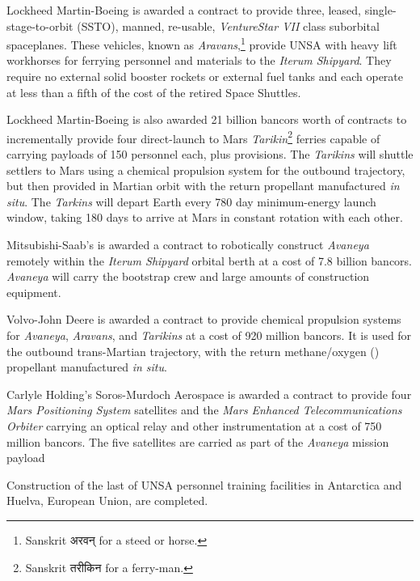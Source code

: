 Lockheed Martin-Boeing is awarded a contract to provide three, leased, single-stage-to-orbit (SSTO), manned, re-usable, {\it VentureStar VII} class suborbital spaceplanes. These vehicles, known as {\it Aravans},\footnote{Sanskrit अरवन् for a steed or horse.} provide UNSA with heavy lift workhorses for ferrying personnel and materials to the {\it Iterum Shipyard}. They require no external solid booster rockets or external fuel tanks and each operate at less than a fifth of the cost of the retired Space Shuttles.

Lockheed Martin-Boeing is also awarded 21 billion bancors worth of contracts to incrementally provide four direct-launch to Mars {\it Tarikin}\footnote{Sanskrit तरीकिन for a ferry-man.} ferries capable of carrying payloads of 150 personnel each, plus provisions. The {\it Tarikins} will shuttle settlers to Mars using a chemical  propulsion system for the outbound trajectory, but then provided in Martian orbit with the return  propellant manufactured {\it in situ}. The {\it Tarkins} will depart Earth every 780 day minimum-energy launch window, taking 180 days to arrive at Mars in constant rotation with each other.

Mitsubishi-Saab's is awarded a contract to robotically construct {\it Avaneya} remotely within the {\it Iterum Shipyard} orbital berth at a cost of 7.8 billion bancors. {\it Avaneya} will carry the bootstrap crew and large amounts of construction equipment.

Volvo-John Deere is awarded a contract to provide chemical propulsion systems for {\it Avaneya}, {\it Aravans}, and {\it Tarikins} at a cost of 920 million bancors. It is used for the outbound trans-Martian trajectory, with the return methane/oxygen () propellant manufactured {\it in situ}.

Carlyle Holding's Soros-Murdoch Aerospace is awarded a contract to provide four {\it Mars Positioning System} satellites and the {\it Mars Enhanced Telecommunications Orbiter} carrying an optical relay and other instrumentation at a cost of 750 million bancors. The five satellites are carried as part of the {\it Avaneya} mission payload
\StopTimelineDate

Construction of the last of UNSA personnel training facilities in Antarctica and Huelva, European Union, are completed.
\StopTimelineDate


